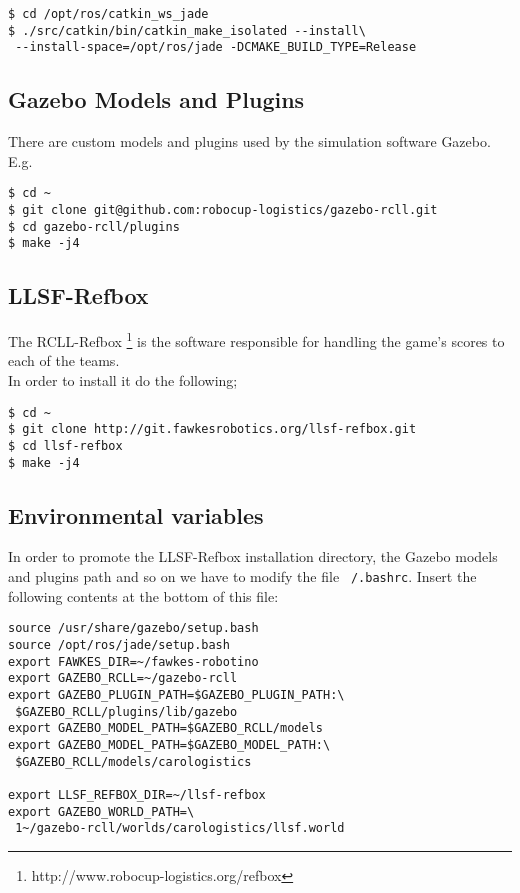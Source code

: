 \documentclass[oribibl]{llncs}
\begin{document}
\begin{lstlisting}[frame=single]
$ cd /opt/ros/catkin_ws_jade
$ ./src/catkin/bin/catkin_make_isolated --install\
 --install-space=/opt/ros/jade -DCMAKE_BUILD_TYPE=Release
\end{lstlisting}

\subsection{Gazebo Models and Plugins}
There are custom models and plugins used by the simulation software Gazebo. E.g. 
\begin{lstlisting}[frame=single]
$ cd ~
$ git clone git@github.com:robocup-logistics/gazebo-rcll.git
$ cd gazebo-rcll/plugins
$ make -j4
\end{lstlisting}

\subsection{LLSF-Refbox}
The RCLL-Refbox \footnote{http://www.robocup-logistics.org/refbox} is the software responsible for handling the game's scores to each of the teams.\\
In order to install it do the following;
\begin{lstlisting}[frame=single]
$ cd ~
$ git clone http://git.fawkesrobotics.org/llsf-refbox.git
$ cd llsf-refbox
$ make -j4
\end{lstlisting}

\subsection{Environmental variables}
In order to promote the LLSF-Refbox installation directory, the Gazebo models and plugins path and so on we have to modify the file \texttt{~/.bashrc}. Insert the following contents at the bottom of this file:
\begin{lstlisting}[frame=single]
source /usr/share/gazebo/setup.bash
source /opt/ros/jade/setup.bash
export FAWKES_DIR=~/fawkes-robotino
export GAZEBO_RCLL=~/gazebo-rcll
export GAZEBO_PLUGIN_PATH=$GAZEBO_PLUGIN_PATH:\
 $GAZEBO_RCLL/plugins/lib/gazebo
export GAZEBO_MODEL_PATH=$GAZEBO_RCLL/models
export GAZEBO_MODEL_PATH=$GAZEBO_MODEL_PATH:\
 $GAZEBO_RCLL/models/carologistics

export LLSF_REFBOX_DIR=~/llsf-refbox
export GAZEBO_WORLD_PATH=\
 1~/gazebo-rcll/worlds/carologistics/llsf.world
\end{lstlisting}
\end{document}
